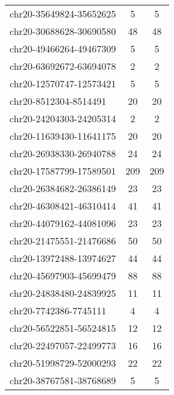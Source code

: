\begin{longtable}{lSS}
	chr20-35649824-35652625 & 5      & 5                                         \\
	chr20-30688628-30690580 & 48     & 48                                        \\
	chr20-49466264-49467309 & 5      & 5                                         \\
	chr20-63692672-63694078 & 2      & 2                                         \\
	chr20-12570747-12573421 & 5      & 5                                         \\
	chr20-8512304-8514491   & 20     & 20                                        \\
	chr20-24204303-24205314 & 2      & 2                                         \\
	chr20-11639430-11641175 & 20     & 20                                        \\
	chr20-26938330-26940788 & 24     & 24                                        \\
	chr20-17587799-17589501 & 209    & 209                                       \\
	chr20-26384682-26386149 & 23     & 23                                        \\
	chr20-46308421-46310414 & 41     & 41                                        \\
	chr20-44079162-44081096 & 23     & 23                                        \\
	chr20-21475551-21476686 & 50     & 50                                        \\
	chr20-13972488-13974627 & 44     & 44                                        \\
	chr20-45697903-45699479 & 88     & 88                                        \\
	chr20-24838480-24839925 & 11     & 11                                        \\
	chr20-7742386-7745111   & 4      & 4                                         \\
	chr20-56522851-56524815 & 12     & 12                                        \\
	chr20-22497057-22499773 & 16     & 16                                        \\
	chr20-51998729-52000293 & 22     & 22                                        \\
	chr20-38767581-38768689 & 5      & 5                                         \\

\end{longtable}
